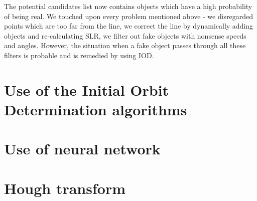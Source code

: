 	The potential candidates list now contains objects which have a high probability of being real. We touched upon every problem mentioned above - we disregarded points which are too far from the line, we correct the line by dynamically adding objects and re-calculating SLR, we filter out fake objects with nonsense speeds and angles. However, the situation when a fake object passes through all these filters is probable and is remedied by using IOD.

\section{Use of the Initial Orbit Determination algorithms}\label{sec:IDO}

\section{Use of neural network}\label{sec:neural}

\section{Hough transform}\label{sec:hough}